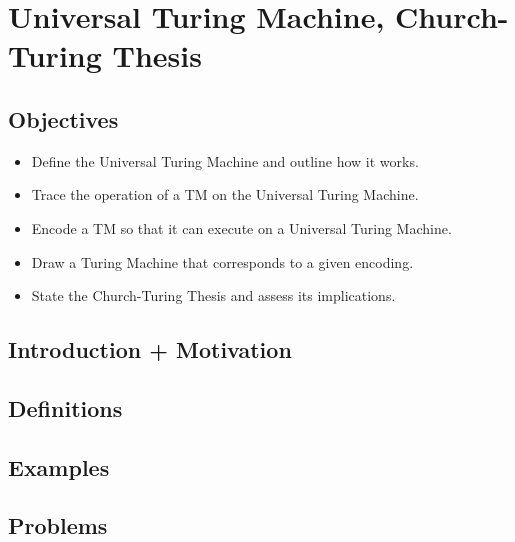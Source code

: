 \chapter{Universal Turing Machine, Church-Turing Thesis}

\section{Objectives}

\begin{itemize}
	\item Define the Universal Turing Machine and outline how it works.
	\item Trace the operation of a TM on the Universal Turing Machine.
	\item Encode a TM so that it can execute on a Universal Turing Machine.
	\item Draw a Turing Machine that corresponds to a given encoding.
	\item State the Church-Turing Thesis and assess its implications.
\end{itemize}

\section{Introduction + Motivation}

\section{Definitions}

\section{Examples}

\section{Problems}